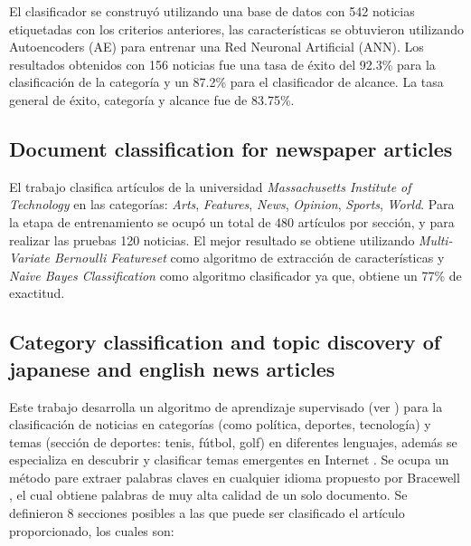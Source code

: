 El clasificador se construyó utilizando una base de datos con 542 noticias etiquetadas con los criterios anteriores, las características se obtuvieron utilizando Autoencoders (AE) para entrenar una Red Neuronal Artificial (ANN).
Los resultados obtenidos con 156 noticias fue una tasa de éxito del 92.3\% para la clasificación de la categoría y un 87.2\% para el clasificador de alcance.
La tasa general de éxito, categoría y alcance fue de 83.75\%.\\

\begin{large}
	 \subsection{Document classification for newspaper articles}
\end{large}

El trabajo clasifica artículos de la universidad \textit{Massachusetts Institute of Technology} \citep{CD4} en las categorías: \textit{Arts}, \textit{Features}, \textit{News}, \textit{Opinion}, \textit{Sports}, \textit{World}. Para la etapa de entrenamiento se ocupó un total de 480 artículos por sección, y para realizar las pruebas 120 noticias. El mejor resultado se obtiene utilizando \textit{Multi-Variate Bernoulli Featureset} como algoritmo de extracción de características y \textit{Naive Bayes Classification} como algoritmo clasificador ya que, obtiene  un 77\% de exactitud.\\



\begin{large}
	 \subsection[Category classification and topic discovery]{Category classification and topic discovery of japanese and english news articles}
\end{large}


Este trabajo desarrolla un algoritmo de aprendizaje supervisado (ver ) para la clasificación de noticias en categorías (como política, deportes, tecnología) y temas (sección de deportes: tenis, fútbol, golf) en diferentes lenguajes, además se especializa en descubrir y clasificar temas emergentes en Internet \citep{CD6}. Se ocupa un método pare extraer palabras claves en cualquier idioma propuesto por Bracewell \citep{CD5}, el cual obtiene palabras de muy alta calidad de un solo documento. Se definieron 8 secciones posibles a las que puede ser clasificado el artículo proporcionado, los cuales son:

